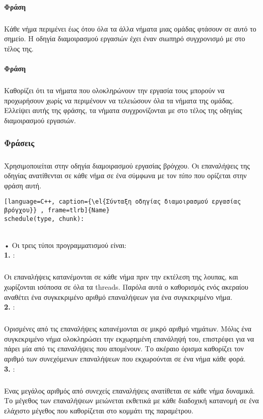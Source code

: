 \paragraph{Φράση }
\subparagraph{}
Kάθε νήμα περιμένει έως ότου όλα τα άλλα νήματα μιας ομάδας φτάσουν σε αυτό το σημείο. Η οδηγία διαμοιρασμού εργασιών έχει έναν σιωπηρό συγχρονισμό με \emph{} στο τέλος της.
\clearpage
\paragraph{Φράση }
\subparagraph{}
Καθορίζει ότι τα νήματα που ολοκληρώνουν την εργασία τους μπορούν να προχωρήσουν χωρίς να περιμένουν να τελειώσουν όλα τα νήματα της ομάδας. Ελλείψει αυτής της φράσης, τα νήματα συγχρονίζονται με \emph{} στο τέλος της οδηγίας διαμοιρασμού εργασιών.

\subsubsection{Φράσεις }
\subparagraph{}
      Χρησιμοποιείται στην οδηγία διαμοιρασμού εργασίας βρόγχου. Οι επαναλήψεις της οδηγίας ανατίθενται σε κάθε νήμα σε ένα σύμφωνα με τον \emph{τύπο} που ορίζεται στην φράση αυτή.
\begin{lstlisting}[language=C++, caption={\el{Σύνταξη οδηγίας διαμοιρασμού εργασίας βρόγχου}} , frame=tlrb]{Name}
schedule(type, chunk): 
\end{lstlisting}
\ \\
    •  Οι τρεις τύποι προγραμματισμού είναι:\\
      
    \textbf{1. }:
    \subparagraph{}

       Οι επαναλήψεις κατανέμονται σε κάθε νήμα πριν την εκτέλεση της λουπας, και χωρίζονται ισόποσα σε όλα τα threads. Παρόλα αυτά ο καθορισμός ενός ακεραίου αναθέτει ένα συγκεκριμένο αριθμό επαναλήψεων για ένα συγκεκριμένο νήμα.\\
       
    \textbf{2. }: 
    \subparagraph{}
       Ορισμένες από τις επαναλήψεις κατανέμονται σε μικρό αριθμό νημάτων. Μόλις ένα συγκεκριμένο νήμα ολοκληρώσει την εκχωρημένη επανάληψή του, επιστρέφει για να πάρει μία από τις επαναλήψεις που απομένουν. Το ακέραιο όρισμα καθορίζει τον αριθμό των συνεχόμενων επαναλήψεων που εκχωρούνται σε ένα νήμα κάθε φορά.\\
\clearpage
    \textbf{3. }: 
    \subparagraph{}
       Ενας μεγάλος αριθμός από συνεχείς επαναλήψεις ανατίθεται σε κάθε νήμα δυναμικά. Το μέγεθος των επαναλήψεων μειώνεται εκθετικά με κάθε διαδοχική κατανομή σε ένα ελάχιστο μέγεθος που καθορίζεται στο κομμάτι της παραμέτρου.\\
       
